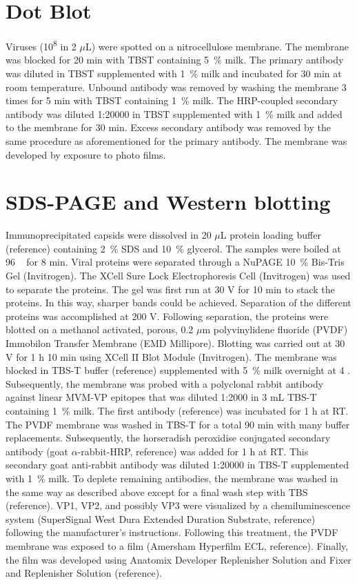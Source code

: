 \section{Dot Blot}
Viruses (10\textsuperscript{8} in 2 $\mu$L) were spotted on a nitrocellulose membrane. The membrane was blocked for 20 min with TBST containing 5~\% milk. The primary antibody was diluted in TBST supplemented with 1~\% milk and incubated for 30 min at room temperature. Unbound antibody was removed by washing the membrane 3 times for 5 min with TBST containing 1~\% milk. The HRP-coupled secondary antibody was diluted 1:20000 in TBST supplemented with 1~\% milk and added to the membrane for 30 min. Excess secondary antibody was removed by the same procedure as aforementioned for the primary antibody. The membrane was developed by exposure to photo films.    


\section{SDS-PAGE and Western blotting}

Immunoprecipitated capsids were dissolved in 20 $\mu$L protein loading buffer (reference) containing 2~\% SDS and 10~\% glycerol. The samples were boiled at 96 \textcelsius~ for 8 min. Viral proteins were separated through a NuPAGE\textsuperscript{\textregistered} 10~\% Bis-Tris Gel (Invitrogen). The XCell Sure Lock\textsuperscript{\texttrademark} Electrophoresis Cell (Invitrogen) was used to separate the proteins. The gel was first run at 30 V for 10 min to stack the proteins. In this way, sharper bands could be achieved. Separation of the different proteins was accomplished at 200 V. Following separation, the proteins were blotted on a methanol activated, porous, 0.2 $\mu$m polyvinylidene fluoride (PVDF) Immobilon\textsuperscript{\textregistered} Transfer Membrane (EMD Millipore). Blotting was carried out at 30 V for 1 h 10 min using XCell II\textsuperscript{\texttrademark} Blot Module (Invitrogen). 
The membrane was blocked in TBS-T buffer (reference) supplemented with 5~\% milk overnight at 4 \textcelsius. Subsequently, the membrane was probed with a polyclonal rabbit antibody against linear MVM-VP epitopes that was diluted 1:2000 in 3 mL TBS-T containing 1~\% milk. The first antibody (reference) was incubated for 1 h at RT. The PVDF membrane was washed in TBS-T for a total 90 min with many buffer replacements. Subsequently, the horseradish peroxidise conjugated secondary antibody (goat $\alpha$-rabbit-HRP, reference) was added for 1 h at RT. This secondary goat anti-rabbit antibody was diluted 1:20000 in TBS-T supplemented with 1~\% milk. To deplete remaining antibodies, the membrane was washed in the same way as described above except for a final wash step with TBS (reference). VP1, VP2, and possibly VP3 were visualized by a chemiluminescence system (SuperSignal West Dura Extended Duration Substrate, reference) following the manufacturer’s instructions. Following this treatment, the PVDF membrane was exposed to a film (Amersham Hyperfilm\textsuperscript{\texttrademark} ECL, reference). Finally, the film was developed using Anatomix Developer Replenisher Solution and Fixer and Replenisher Solution (reference).



